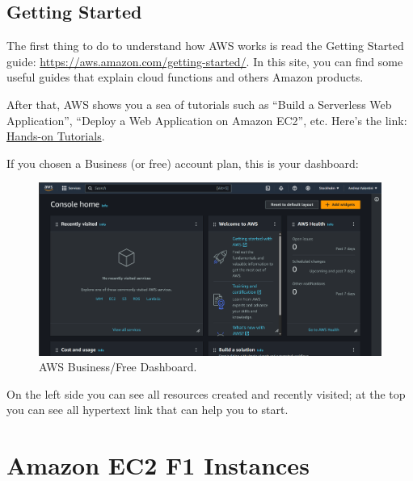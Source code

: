 \documentclass[a4paper]{article}
\newcommand{\dquotes}[1]{``#1''}
\begin{document}
    \newpage

    \subsection{Getting Started}

    The first thing to do to understand how AWS works is read the Getting Started guide: \url{https://aws.amazon.com/getting-started/}. In this site, you can find some useful guides that explain cloud functions and others Amazon products.\newline

    \noindent
    After that, AWS shows you a sea of tutorials such as \dquotes{Build a Serverless Web Application}, \dquotes{Deploy a Web Application on Amazon EC2}, etc. Here's the link: \href{https://aws.amazon.com/getting-started/hands-on/?pg=gs&sec=lyfa&getting-started-all.sort-by=item.additionalFields.content-latest-publish-date&getting-started-all.sort-order=desc&awsf.getting-started-category=*all&awsf.getting-started-content-type=*all}{Hands-on Tutorials}.\newline

    \noindent
    If you chosen a Business (or free) account plan, this is your dashboard:
    \begin{figure}[!htp]
        \centering
        \includegraphics[width=\textwidth]{img/business-free_dashboard.png}
        \caption{AWS Business/Free Dashboard.}
    \end{figure}

    \noindent
    On the left side you can see all resources created and recently visited; at the top you can see all hypertext link that can help you to start.\newpage

    \section{Amazon EC2 F1 Instances}
\end{document}
